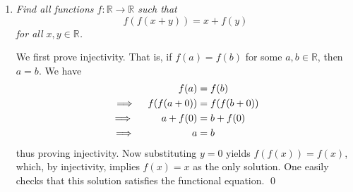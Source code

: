 \documentclass{article}
\begin{document}
\begin{enumerate}[1.]
\vspace{12pt}
\item %
\textit{Find all functions $f : \mathbb{R} \to \mathbb{R}$ such that
$$ f(f(x+y)) = x + f(y) $$
for all $x, y \in \mathbb{R}$.}

We first prove injectivity. That is, if $f(a) = f(b)$ for some $a, b \in \mathbb{R}$, then $a = b$. We have
\begin{align*}
    f(a) &= f(b) \\
    \implies \quad f(f(a + 0)) &= f(f(b + 0)) \\
    \implies \quad \hspace{5.5mm} a + f(0) &= b + f(0) \\
    \implies \quad \hspace{16mm} a &= b 
\end{align*}
thus proving injectivity. Now substituting $y = 0$ yields $f(f(x)) = f(x)$, which, by injectivity, implies $f(x) = x$ as the only solution. One easily checks that this solution satisfies the functional equation. \qed 


\end{enumerate}
\end{document}
